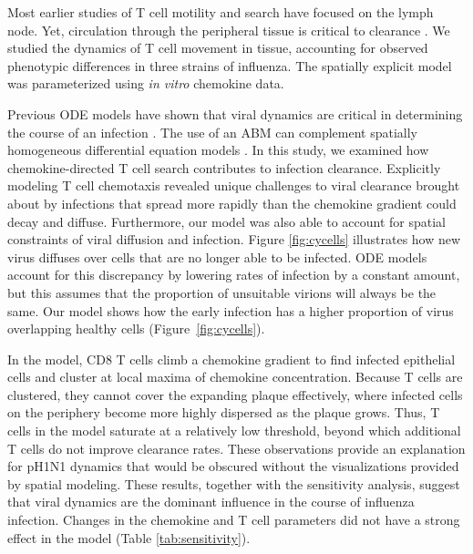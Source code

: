 \documentclass[10pt]{article}
\begin{document}

Most earlier studies of T cell motility and search have focused on the lymph node.  Yet, circulation through the peripheral tissue is critical to clearance \cite{Pawelek2012, Ganusov2014}.  We studied the dynamics of T cell movement in tissue, accounting for observed phenotypic differences in three strains of influenza.  The spatially explicit model was parameterized using \textit{in vitro} chemokine data.

Previous ODE models have shown that viral dynamics are critical in determining the course of an infection \cite{Handel2008, Lee2009, Miao2010, Mitchell2011, Saenz2010}.  The use of an ABM can complement spatially homogeneous differential equation models \cite{Beltman2007, Textor2014, Vroomans2012, Zheng2008}.  In this study, we examined how chemokine-directed T cell search contributes to infection clearance.  Explicitly modeling T cell chemotaxis revealed unique challenges to viral clearance brought about by infections that spread more rapidly than the chemokine gradient could decay and diffuse.  Furthermore, our model was also able to account for spatial constraints of viral diffusion and infection.  Figure \ref{fig:cycells} illustrates how new virus diffuses over cells that are no longer able to be infected.  ODE models account for this discrepancy by lowering rates of infection by a constant amount, but this assumes that the proportion of unsuitable virions will always be the same.  Our model shows how the early infection has a higher proportion of virus overlapping healthy cells (Figure~\ref{fig:cycells}).  

In the model, CD8 T cells climb a chemokine gradient to find infected epithelial cells and cluster at local maxima of chemokine concentration.  Because T cells are clustered, they cannot cover the expanding plaque effectively, where infected cells on the periphery become more highly dispersed as the plaque grows.  Thus, T cells in the model saturate at a relatively low threshold, beyond which additional T cells do not improve clearance rates. These observations provide an explanation for pH1N1 dynamics that would be obscured without the visualizations provided by spatial modeling.  These results, together with the sensitivity analysis, suggest that viral dynamics are the dominant influence in the course of influenza infection.  Changes in the chemokine and T cell parameters did not have a strong effect in the model (Table \ref{tab:sensitivity}).  
\end{document}
